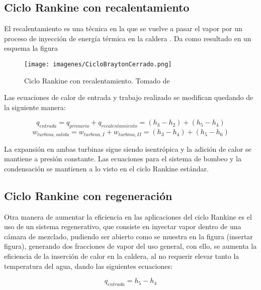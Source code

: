 \subsection{Ciclo Rankine con recalentamiento}

El recalentamiento es una técnica en la que se vuelve a pasar el vapor por un proceso de inyección de energía térmica en la caldera \cite{ccengel2006termodinamica}. Da como resultado en un esquema la figura 

\begin{figure}[H]
    \centering
    \texttt{[image: imagenes/CicloBraytonCerrado.png]}
    \caption{Ciclo Rankine con recalentamiento. \linebreak Tomado de \force \textcite{ccengel2006termodinamica}}
    \label{fig:rankinerecal}
\end{figure}

Las ecuaciones de calor de entrada y trabajo realizado se modifican quedando de la siguiente manera:

\begin{equation}
    q_{entrada}=q_{primario}+q_{recalentamiento}=(h_{3}-h_{2})+(h_{5}-h_{4})
\end{equation}
\begin{equation}
    w_{turbina,salida}=w_{turbina,I}+w_{turbina,II}=(h_{3}-h_{4})+(h_{5}-h_{6})
\end{equation}

La expansión en ambas turbinas sigue siendo isentrópica y la adición de calor se mantiene a presión constante. Las ecuaciones para el sistema de bombeo y la condensación se mantienen a lo visto en el ciclo Rankine estándar.

\subsection{Ciclo Rankine con regeneración}

Otra manera de aumentar la eficiencia en las aplicaciones del ciclo Rankine es el uso de un sistema regenerativo, que consiste en inyectar vapor dentro de una cámara de mezclado, pudiendo ser abierto como se muestra en la figura (insertar figura), generando dos fracciones de vapor del uso general, con ello, se aumenta la eficiencia de la inserción de calor en la caldera, al no requerir elevar tanto la temperatura del agua, dando las siguientes ecuaciones:

\begin{equation}
    q_{entrada}=h_{5}-h_{4}
\end{equation}

